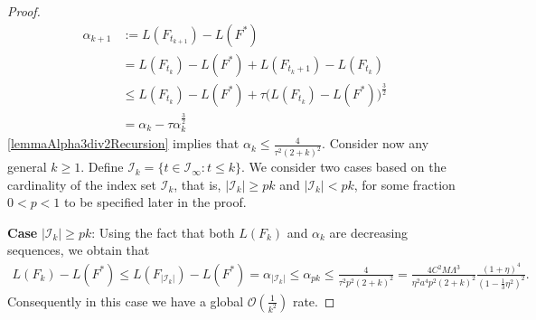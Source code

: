 \documentclass{article}
\theoremstyle{plain}
\theoremstyle{definition}
\theoremstyle{remark}
\begin{document}
\begin{proof}
    \begin{align}
        \alpha_{k+1} 
        &:=  L(F_{t_{k+1}}) - L(F^*) \\
        &= L(F_{t_k}) - L(F^*) +  L(F_{t_k+1}) - L(F_{t_k}) \\
        &\leq  L(F_{t_k}) - L(F^*) + \tau \bigg(L(F_{t_k}) - L(F^*) \bigg)^\frac{3}{2} \\
        &= \alpha_k - \tau \alpha_k^\frac{3}{2}
    \end{align}
    \cref{lemmaAlpha3div2Recursion} implies that $\alpha_{k} \leq \frac{4}{\tau^2(2+k)^2}$. Consider now any general $k\geq 1$. Define $\mathcal{I}_k = \{ t \in \mathcal{I}_\infty : t \leq k\}$. We consider two cases based on the cardinality of the index set $\mathcal{I}_k$, that is, $|\mathcal{I}_k| \geq pk$ and $|\mathcal{I}_k| < pk$, for some fraction $0<p<1$ to be specified later in the proof. 
    
    \textbf{Case} $|\mathcal{I}_k| \geq pk$: Using the fact that both $L(F_k)$ and $\alpha_k$ are decreasing sequences, we obtain that
    \begin{align}
        L(F_k) - L(F^*) 
        \leq L(F_{|\mathcal{I}_k|}) - L(F^*) 
        = \alpha_{|\mathcal{I}_k|} 
        \leq \alpha_{pk}
        \leq \frac{4}{\tau^2p^2(2+k)^2}
        = \frac{4 C^2 M \Lambda^3}{\eta^2 a^4p^2(2+k)^2}\frac{(1+\eta)^4}{(1-\frac{1}{3}\eta^2)^2}.
    \end{align}
    Consequently in this case we have a global $\mathcal{O}(\frac{1}{k^2})$ rate.
    

\end{proof}
\end{document}
